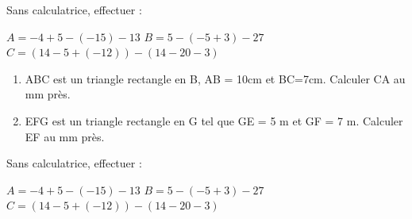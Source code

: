 \documentclass[a4paper]{book}
\begin{document}
    \begin{exercice}
        Sans calculatrice, effectuer : 

        $A=-4+5-(-15)-13$ \quad $B=5-(-5+3)-27$ \quad $C=(14-5+(-12))-(14-20-3)$
    \end{exercice}


\bigskip


\setcounter{exo}{1}
    

    \begin{exercice}
        \begin{enumerate}
            \item ABC est un triangle rectangle en B, AB = 10cm et BC=7cm. Calculer CA au mm près.

            \item EFG est un triangle rectangle en G tel que GE = 5 m et GF = 7 m. Calculer EF au mm près.
        \end{enumerate}
    \end{exercice}


    \begin{exercice}
        Sans calculatrice, effectuer : 

        $A=-4+5-(-15)-13$ \quad $B=5-(-5+3)-27$ \quad $C=(14-5+(-12))-(14-20-3)$
    \end{exercice}   
    
\end{document}
